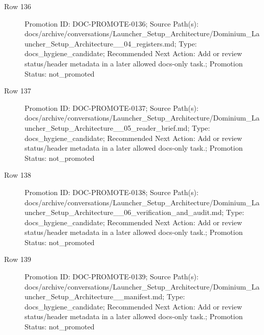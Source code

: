 \documentclass[9pt,a4paper,openany]{book}
\begin{document}
\begin{description}
\item[Row 136] Promotion ID: DOC-\allowbreak{}PROMOTE-\allowbreak{}0136; Source Path(s): docs/\allowbreak{}archive/\allowbreak{}conversations/\allowbreak{}Launcher\_\allowbreak{}Setup\_\allowbreak{}Architecture/\allowbreak{}Dominium\_\allowbreak{}Launcher\_\allowbreak{}Setup\_\allowbreak{}Architecture\_\allowbreak{}\_\allowbreak{}04\_\allowbreak{}registers.\allowbreak{}md; Type: docs\_\allowbreak{}hygiene\_\allowbreak{}candidate; Recommended Next Action: Add or review status/\allowbreak{}header metadata in a later allowed docs-\allowbreak{}only task.\allowbreak{}; Promotion Status: not\_\allowbreak{}promoted
\item[Row 137] Promotion ID: DOC-\allowbreak{}PROMOTE-\allowbreak{}0137; Source Path(s): docs/\allowbreak{}archive/\allowbreak{}conversations/\allowbreak{}Launcher\_\allowbreak{}Setup\_\allowbreak{}Architecture/\allowbreak{}Dominium\_\allowbreak{}Launcher\_\allowbreak{}Setup\_\allowbreak{}Architecture\_\allowbreak{}\_\allowbreak{}05\_\allowbreak{}reader\_\allowbreak{}brief.\allowbreak{}md; Type: docs\_\allowbreak{}hygiene\_\allowbreak{}candidate; Recommended Next Action: Add or review status/\allowbreak{}header metadata in a later allowed docs-\allowbreak{}only task.\allowbreak{}; Promotion Status: not\_\allowbreak{}promoted
\item[Row 138] Promotion ID: DOC-\allowbreak{}PROMOTE-\allowbreak{}0138; Source Path(s): docs/\allowbreak{}archive/\allowbreak{}conversations/\allowbreak{}Launcher\_\allowbreak{}Setup\_\allowbreak{}Architecture/\allowbreak{}Dominium\_\allowbreak{}Launcher\_\allowbreak{}Setup\_\allowbreak{}Architecture\_\allowbreak{}\_\allowbreak{}06\_\allowbreak{}verification\_\allowbreak{}and\_\allowbreak{}audit.\allowbreak{}md; Type: docs\_\allowbreak{}hygiene\_\allowbreak{}candidate; Recommended Next Action: Add or review status/\allowbreak{}header metadata in a later allowed docs-\allowbreak{}only task.\allowbreak{}; Promotion Status: not\_\allowbreak{}promoted
\item[Row 139] Promotion ID: DOC-\allowbreak{}PROMOTE-\allowbreak{}0139; Source Path(s): docs/\allowbreak{}archive/\allowbreak{}conversations/\allowbreak{}Launcher\_\allowbreak{}Setup\_\allowbreak{}Architecture/\allowbreak{}Dominium\_\allowbreak{}Launcher\_\allowbreak{}Setup\_\allowbreak{}Architecture\_\allowbreak{}\_\allowbreak{}manifest.\allowbreak{}md; Type: docs\_\allowbreak{}hygiene\_\allowbreak{}candidate; Recommended Next Action: Add or review status/\allowbreak{}header metadata in a later allowed docs-\allowbreak{}only task.\allowbreak{}; Promotion Status: not\_\allowbreak{}promoted

\end{description}
\end{document}
